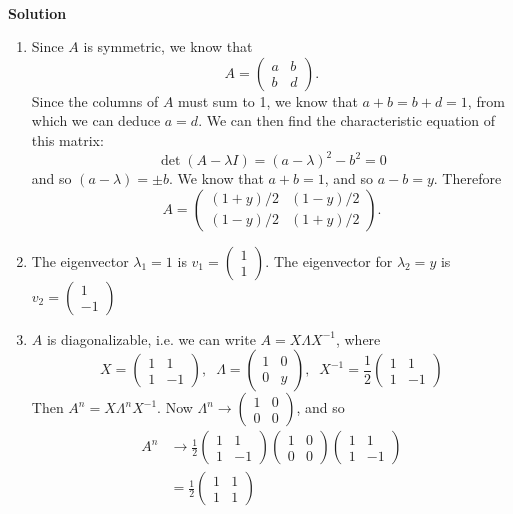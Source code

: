 \documentclass[11pt]{article}
\begin{document}
\

\noindent \textbf{Solution}\\
\begin{enumerate}
\item Since $A$ is symmetric, we know that 
$$A = \begin{pmatrix} a & b \\ b & d \end{pmatrix}.$$
Since the columns of $A$ must sum to 1, we know that $ a+b = b+d = 1$, from which we can deduce $a=d$. We can then find the characteristic equation of this matrix:
$$\det (A-\lambda I) = (a-\lambda)^2 - b^2 = 0$$
and so $(a-\lambda) = \pm b$. We know that $a+b = 1$, and so $a-b = y$. Therefore
$$A = \begin{pmatrix} (1+y)/2 & (1-y)/2 \\ (1-y)/2 & (1+y)/2 \end{pmatrix}.$$
\item The eigenvector $\lambda_1 = 1$ is $v_1 = \begin{pmatrix} 1 \\ 1 \end{pmatrix}$. The eigenvector for $\lambda_2 = y$ is $v_2 = \begin{pmatrix} 1 \\ -1 \end{pmatrix}$
\item $A$ is diagonalizable, i.e. we can write $A = X\Lambda X^{-1}$, where
$$ X = \begin{pmatrix} 1 & 1 \\ 1 & -1 \end{pmatrix}, \;\; \Lambda = \begin{pmatrix} 1 & 0 \\ 0 & y \end{pmatrix}, \;\; X^{-1} = \frac{1}{2} \begin{pmatrix} 1 & 1 \\ 1 & -1 \end{pmatrix}$$
Then $A^n = X\Lambda^n X^{-1}$. Now $\Lambda^n \to \begin{pmatrix} 1 & 0 \\ 0 & 0 \end{pmatrix}$, and so
\begin{align*}
A^n &\to  \frac{1}{2}\begin{pmatrix} 1 & 1 \\ 1 & -1 \end{pmatrix}\begin{pmatrix} 1 & 0 \\ 0 & 0 \end{pmatrix} \begin{pmatrix} 1 & 1 \\ 1 & -1 \end{pmatrix}\\
&=  \frac{1}{2}\begin{pmatrix} 1 & 1 \\ 1 & 1 \end{pmatrix}
\end{align*}
\end{enumerate}
\end{document}
